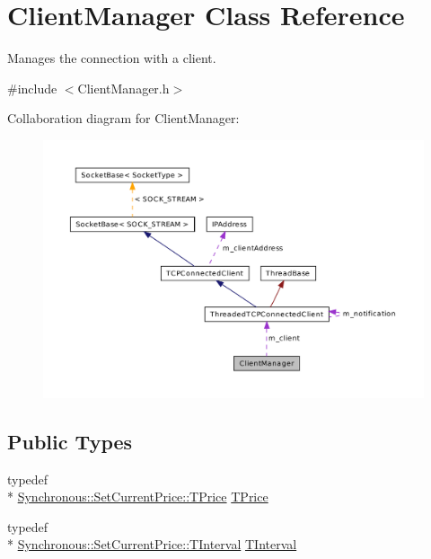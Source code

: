 \hypertarget{class_client_manager}{\section{Client\-Manager Class Reference}
\label{class_client_manager}
}


Manages the connection with a client.  




{\ttfamily \#include $<$Client\-Manager.\-h$>$}



Collaboration diagram for Client\-Manager\-:\nopagebreak
\begin{figure}[H]
\begin{center}
\leavevmode
\includegraphics[width=350pt]{class_client_manager__coll__graph}
\end{center}
\end{figure}
\subsection*{Public Types}
\begin{DoxyCompactItemize}
\item 
typedef \\*
\hyperlink{class_terra_swarm_1_1_synchronous_1_1_set_current_price_a2ed14f2a90070d19a70183bb63e7708e}{Synchronous\-::\-Set\-Current\-Price\-::\-T\-Price} \hyperlink{class_client_manager_ae957a71b432eb6d9d39b0f397cd89874}{T\-Price}
\item 
typedef \\*
\hyperlink{class_terra_swarm_1_1_synchronous_1_1_set_current_price_aa87902078a0788d13ef70b899d83f4d3}{Synchronous\-::\-Set\-Current\-Price\-::\-T\-Interval} \hyperlink{class_client_manager_a429cc3229a8121c83655945ebaec18a6}{T\-Interval}
\end{DoxyCompactItemize}
